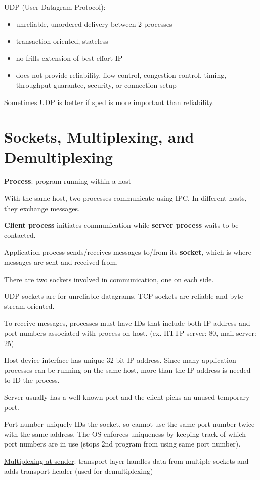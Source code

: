 \documentclass[11pt]{article}
\begin{document}
UDP (User Datagram Protocol):
\begin{itemize}
\item unreliable, unordered delivery between 2 processes
\item transaction-oriented, stateless
\item no-frills extension of best-effort IP
\item does not provide reliability, flow control, congestion control,
timing, throughput guarantee, security, or connection setup
\end{itemize}

Sometimes UDP is better if sped is more important than reliability.
\section{Sockets, Multiplexing, and Demultiplexing}
\label{sec:org467b60b}
\textbf{Process}: program running within a host

With the same host, two processes communicate using IPC.
In different hosts, they exchange messages.

\textbf{Client process} initiates communication while
\textbf{server process} waits to be contacted.

Application process sends/receives messages to/from its \textbf{socket},
which is where messages are sent and received from.

There are two sockets involved in communication, one on each side.

UDP sockets are for unreliable datagrams, TCP sockets are reliable
and byte stream oriented.

To receive messages, processes must have IDs that include both IP
address and port numbers associated with process on host. (ex.
HTTP server: 80, mail server: 25)

Host device interface has unique 32-bit IP address.
Since many application processes can be running on the same host,
more than the IP address is needed to ID the process.

Server usually has a well-known port and the client picks an
unused temporary port.

Port number uniquely IDs the socket, so cannot use the same port number
twice with the same address.
The OS enforces uniqueness by keeping track of which port numbers are in
use (stops 2nd program from using same port number).

\uline{Multiplexing at sender}: transport layer handles data from multiple sockets
and adds transport header (used for demultiplexing)
\end{document}
